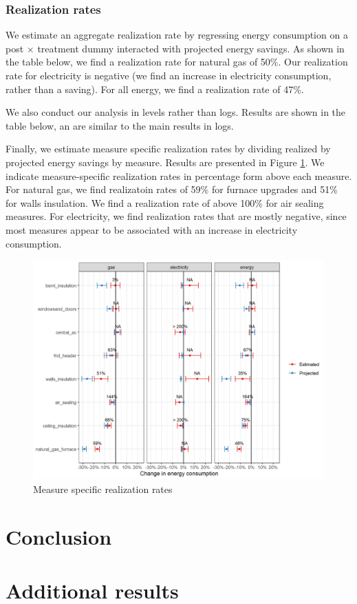 \documentclass{article}
\begin{document}
\subsubsection{Realization rates}
We estimate an aggregate realization rate by regressing energy consumption on a post $\times$ treatment dummy interacted with projected energy savings. As shown in the table below, we find a realization rate for natural gas of 50\%. Our realization rate for electricity is negative (we find an increase in electricity consumption, rather than a saving). For all energy, we find a realization rate of 47\%.



We also conduct our analysis in levels rather than logs. Results are shown in the table below, an are similar to the main results in logs.



Finally, we estimate measure specific realization rates by dividing realized by projected energy savings by measure.  Results are presented in Figure \ref{fig_rr_mbm}. We indicate measure-specific realization rates in percentage form above each measure. For natural gas, we find realizatoin rates of 59\% for furnace upgrades and 51\% for walls insulation. We find a realization rate of above 100\% for air sealing measures. For electricity, we find realization rates that are mostly negative, since most measures appear to be associated with an increase in electricity consumption.

\begin{figure}
	\includegraphics[width=\linewidth]{../output_figures_tables/mbm_realization_rate.png}
	\caption{Measure specific realization rates}\label{fig_rr_mbm}
\end{figure}

\section{Conclusion}

\clearpage


\clearpage

\appendix
\section{Additional results}
\setcounter{table}{0}
\renewcommand{\thetable}{\Alph{section}\arabic{table}}


\end{document}

